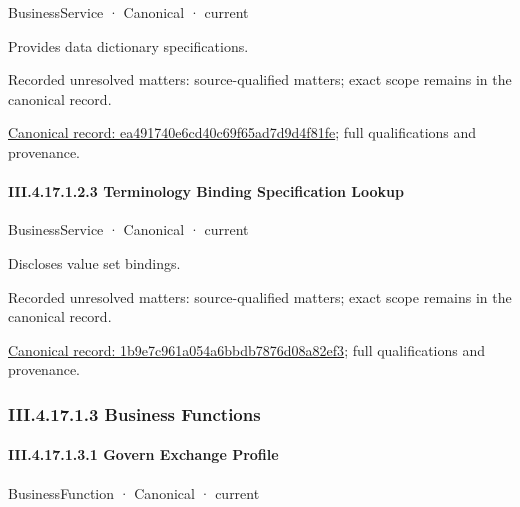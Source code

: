 \label{element:ea491740e6cd40c69f65ad7d9d4f81fe}
{\small BusinessService · Canonical · current}\par

Provides data dictionary specifications.


{\small Recorded unresolved matters: source-qualified matters; exact scope remains in the canonical record.}\par
{\footnotesize \href{../../../../continuum/business/business-service/ea491740e6cd40c69f65ad7d9d4f81fe.md}{Canonical record: ea491740e6cd40c69f65ad7d9d4f81fe}; full qualifications and provenance.}\par
\paragraph*{III.4.17.1.2.3 Terminology Binding Specification Lookup}
\label{navigation:III.4.17.1.2.3}

\label{element:1b9e7c961a054a6bbdb7876d08a82ef3}
{\small BusinessService · Canonical · current}\par

Discloses value set bindings.


{\small Recorded unresolved matters: source-qualified matters; exact scope remains in the canonical record.}\par
{\footnotesize \href{../../../../continuum/business/business-service/1b9e7c961a054a6bbdb7876d08a82ef3.md}{Canonical record: 1b9e7c961a054a6bbdb7876d08a82ef3}; full qualifications and provenance.}\par
\subsubsection*{III.4.17.1.3 Business Functions}
\label{navigation:III.4.17.1.3}

\paragraph*{III.4.17.1.3.1 Govern Exchange Profile}
\label{navigation:III.4.17.1.3.1}

\label{element:935f9a62438944599b913f2614c9e595}
{\small BusinessFunction · Canonical · current}\par

